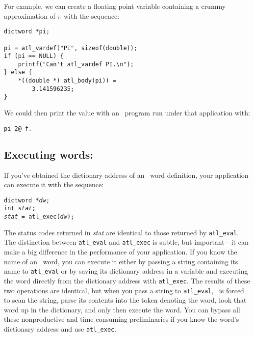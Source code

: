 \documentclass[twocolumn]{article}
\begin{document}
For example, we can create a floating point variable containing a
crummy approximation of $\pi$ with the sequence:

\begin{verbatim}
dictword *pi;

pi = atl_vardef("Pi", sizeof(double));
if (pi == NULL) {
    printf("Can't atl_vardef PI.\n");
} else {
    *((double *) atl_body(pi)) =
        3.141596235;
}
\end{verbatim}

We could then print the value with an \atlast\ program run under that
application with:

{\tt pi 2@ f. }

\subsection{Executing words: }

If you've obtained the dictionary address of an \atlast\ word
definition, your application can execute it with the sequence:

{\tt dictword *{\em dw};\\
int {\em stat};
\\
{\em stat} = \verb+atl_exec+({\em dw});}

The status codes returned in {\em stat} are identical to those
returned by \verb+atl_eval+.  The distinction between \verb+atl_eval+
and \verb+atl_exec+ is subtle, but important---it can make a big
difference in the performance of your application.  If you know the
name of an \atlast\ word, you can execute it either by passing a string
containing its name to \verb+atl_eval+ or by saving its dictionary
address in a variable and executing the word directly from the
dictionary address with \verb+atl_exec+.  The results of these two
operations are identical, but when you pass a string to
\verb+atl_eval+, \atlast\ is forced to scan the string, parse its
contents into the token denoting the word, look that word up in the
dictionary, and only then execute the word.  You can bypass all these
nonproductive and time consuming preliminaries if you know the word's
dictionary address and use \verb+atl_exec+.
\end{document}
